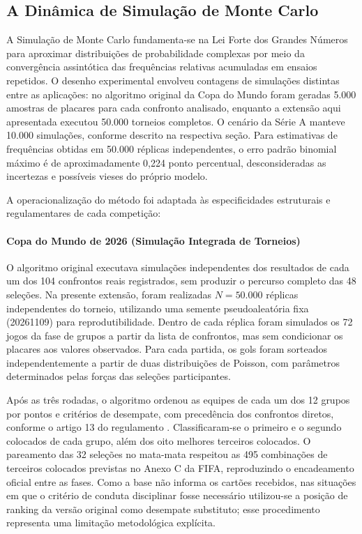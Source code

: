 \documentclass[12pt]{article}
\begin{document}
\subsection{A Dinâmica de Simulação de Monte Carlo}

A Simulação de Monte Carlo fundamenta-se na Lei Forte dos Grandes Números para aproximar distribuições de probabilidade complexas por meio da convergência assintótica das frequências relativas acumuladas em ensaios repetidos. O desenho experimental envolveu contagens de simulações distintas entre as aplicações: no algoritmo original da Copa do Mundo foram geradas 5.000 amostras de placares para cada confronto analisado, enquanto a extensão aqui apresentada executou 50.000 torneios completos. O cenário da Série A manteve 10.000 simulações, conforme descrito na respectiva seção. Para estimativas de frequências obtidas em 50.000 réplicas independentes, o erro padrão binomial máximo é de aproximadamente 0,224 ponto percentual, desconsideradas as incertezas e possíveis vieses do próprio modelo.

A operacionalização do método foi adaptada às especificidades estruturais e regulamentares de cada competição:

\paragraph{Copa do Mundo de 2026 (Simulação Integrada de Torneios)}
O algoritmo original executava simulações independentes dos resultados de cada um dos 104 confrontos reais registrados, sem produzir o percurso completo das 48 seleções. Na presente extensão, foram realizadas $N=50.000$ réplicas independentes do torneio, utilizando uma semente pseudoaleatória fixa (20261109) para reprodutibilidade. Dentro de cada réplica foram simulados os 72 jogos da fase de grupos a partir da lista de confrontos, mas sem condicionar os placares aos valores observados. Para cada partida, os gols foram sorteados independentemente a partir de duas distribuições de Poisson, com parâmetros determinados pelas forças das seleções participantes.

Após as três rodadas, o algoritmo ordenou as equipes de cada um dos 12 grupos por pontos e critérios de desempate, com precedência dos confrontos diretos, conforme o artigo 13 do regulamento \cite{fifa2026regulamento}. Classificaram-se o primeiro e o segundo colocados de cada grupo, além dos oito melhores terceiros colocados. O pareamento das 32 seleções no mata-mata respeitou as 495 combinações de terceiros colocados previstas no Anexo C da FIFA, reproduzindo o encadeamento oficial entre as fases. Como a base não informa os cartões recebidos, nas situações em que o critério de conduta disciplinar fosse necessário utilizou-se a posição de ranking da versão original como desempate substituto; esse procedimento representa uma limitação metodológica explícita.
\end{document}
